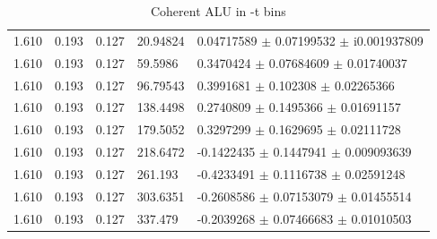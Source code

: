 \begin{table}[!h]
\begin{center}
\begin{tabular}{||l|l|l|l|l||}
                                                                                               
         \hline
         
           1.610 & 0.193 & 0.127 & 20.94824 &  0.04717589 $\pm$ 0.07199532 
         $\pm$ i0.001937809   \\
           1.610 & 0.193 & 0.127 &59.5986  & 0.3470424   $\pm$ 0.07684609 $\pm$ 0.01740037     \\
           1.610 & 0.193 & 0.127 &96.79543 &  0.3991681  $\pm$ 0.102308   $\pm$ 0.02265366     \\
           1.610 & 0.193 & 0.127 &138.4498 &  0.2740809  $\pm$ 0.1495366  $\pm$ 0.01691157     \\
           1.610 & 0.193 & 0.127 &179.5052 &  0.3297299  $\pm$ 0.1629695  $\pm$ 0.02111728     \\
           1.610 & 0.193 & 0.127 &218.6472 &  -0.1422435 $\pm$ 0.1447941  $\pm$ 0.009093639    \\
           1.610 & 0.193 & 0.127 &261.193  & -0.4233491  $\pm$ 0.1116738  $\pm$ 0.02591248     \\
           1.610 & 0.193 & 0.127 &303.6351 &  -0.2608586 $\pm$ 0.07153079 $\pm$ 0.01455514     \\
           1.610 & 0.193 & 0.127 &337.479  & -0.2039268  $\pm$ 0.07466683 $\pm$ 0.01010503     \\
        
         \hline                   
         \hline
      \end{tabular}
      \caption{Coherent ALU in -t bins}
      \label{table:Coh_t_BSA}
   \end{center}
\end{table}






